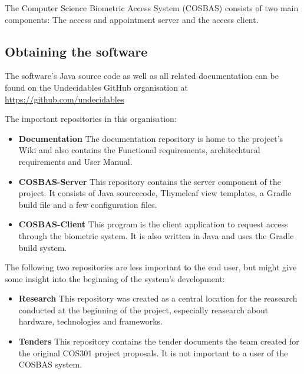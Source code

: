 The Computer Science Biometric Access System (COSBAS) consists of two main components: The access and appointment server and the access client.

\subsection{Obtaining the software}
The software's Java source code as  well as all related documentation can be found on the Undecidables GitHub organisation at \url{https://github.com/undecidables}

The important repositories in this organisation:
\begin{itemize}

	\item \textbf{Documentation} The documentation repository is home to the project's Wiki and also contains the Functional requirements, architechtural requirements and User Manual.
	
	\item \textbf{COSBAS-Server} This repository contains the server component of the project. It consists of Java sourcecode, Thymeleaf view templates, a Gradle build file and  a few configuration files.

	\item \textbf{COSBAS-Client} This program is the client application to request access through the biometric system. It is also written in Java and uses the Gradle build system.

\end{itemize}

The following two repositories are less important to the end user, but might give some insight into the beginning of the system's development:
\begin{itemize}
	\item \textbf{Research} This repository was created as a central location for the reasearch conducted at the beginning of the project, especially reasearch about hardware, technologies and frameworks.
	\item \textbf{Tenders} This repository contains the tender documents the team created for the original COS301 project proposals. It is not important to a user of the COSBAS system.

\end{itemize}


